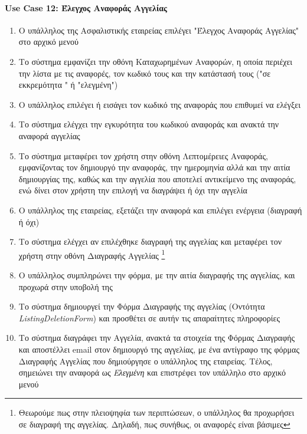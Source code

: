 \documentclass{../ol-softwaremanual}
\begin{document}
	\newpage
	\centering
	
	\paragraph{\en Use Case 12: \gr Έλεγχος Αναφοράς Αγγελίας} 
	
	\begin{enumerate}
		\item Ο υπάλληλος της Ασφαλιστικής εταιρείας επιλέγει \en"\gr Έλεγχος Αναφοράς Αγγελίας\en" \gr στο αρχικό μενού
		\item Το σύστημα εμφανίζει την οθόνη Καταχωρημένων Αναφορών, η οποία περιέχει την λίστα με τις αναφορές, τον κωδικό τους και την κατάστασή τους (\en"\gr σε εκκρεμότητα \en" \gr ή \en"\gr ελεγμένη\en"\gr)
		\item Ο υπάλληλος επιλέγει ή εισάγει τον κωδικό της αναφοράς που επιθυμεί να ελέγξει 
		\item Το σύστημα ελέγχει την εγκυρότητα του κωδικού αναφοράς και ανακτά την αναφορά αγγελίας
		\item Το σύστημα μεταφέρει τον χρήστη στην οθόνη Λεπτομέρειες Αναφοράς, εμφανίζοντας τον δημιουργό την αναφοράς, την ημερομηνία αλλά και την αιτία δημιουργίας της, καθώς και την αγγελία που αποτελεί αντικείμενο της αναφοράς, ενώ δίνει στον χρήστη την επιλογή να διαγράψει ή όχι την αγγελία
		\item Ο υπάλληλος της εταιρείας, εξετάζει την αναφορά και επιλέγει ενέργεια (διαγραφή ή όχι)
		\item Το σύστημα ελέγχει αν επιλέχθηκε διαγραφή της αγγελίας και μεταφέρει τον χρήστη στην οθόνη Διαγραφής Αγγελίας \footnote[6]{Θεωρούμε πως στην πλειοψηφία των περιπτώσεων, ο υπάλληλος θα προχωρήσει σε διαγραφή της αγγελίας. Δηλαδή, πως συνήθως, οι αναφορές είναι βάσιμες}
		\item Ο υπάλληλος συμπληρώνει την φόρμα, με την αιτία διαγραφής της αγγελίας, και προχωρά στην υποβολή της
		\item Το σύστημα δημιουργεί την Φόρμα Διαγραφής της αγγελίας (Οντότητα \en \textit{ListingDeletionForm}\gr) και προσθέτει σε αυτήν τις απαραίτητες πληροφορίες
		\item Το σύστημα διαγράφει την Αγγελία, ανακτά τα στοιχεία της Φόρμας Διαγραφής και αποστέλλει \en email \gr στον δημιουργό της αγγελίας, με ένα αντίγραφο της φόρμας Διαγραφής Αγγελίας που δημιούργησε ο υπάλληλος της εταιρείας. Τέλος, σημειώνει την αναφορά ως \textit{Ελεγμένη} και επιστρέφει τον υπάλληλο στο αρχικό μενού
	\end{enumerate}
	
\end{document}

